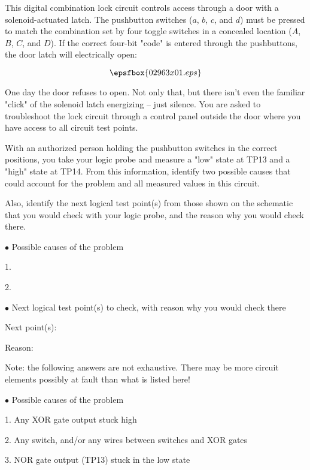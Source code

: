 

This digital combination lock circuit controls access through a door with a solenoid-actuated latch.  The pushbutton switches ($a$, $b$, $c$, and $d$) must be pressed to match the combination set by four toggle switches in a concealed location ($A$, $B$, $C$, and $D$).  If the correct four-bit "code" is entered through the pushbuttons, the door latch will electrically open:

$$\epsfbox{02963x01.eps}$$

One day the door refuses to open.  Not only that, but there isn't even the familiar "click" of the solenoid latch energizing -- just silence.  You are asked to troubleshoot the lock circuit through a control panel outside the door where you have access to all circuit test points.

With an authorized person holding the pushbutton switches in the correct positions, you take your logic probe and measure a "low" state at TP13 and a "high" state at TP14.  From this information, identify two possible causes that could account for the problem and all measured values in this circuit.

Also, identify the next logical test point(s) from those shown on the schematic that you would check with your logic probe, and the reason why you would check there.

\medskip
\item{$\bullet$} Possible causes of the problem
\item{1.}
\item{2.} 
\medskip

\medskip
\item{$\bullet$} Next logical test point(s) to check, with reason why you would check there
\item{Next point(s):}
\item{Reason:}
\medskip







Note: the following answers are not exhaustive.  There may be more circuit elements possibly at fault than what is listed here!

\medskip
\goodbreak
\item{$\bullet$} Possible causes of the problem
\item{1.} Any XOR gate output stuck high
\item{2.} Any switch, and/or any wires between switches and XOR gates
\item{3.} NOR gate output (TP13) stuck in the low state
\medskip

